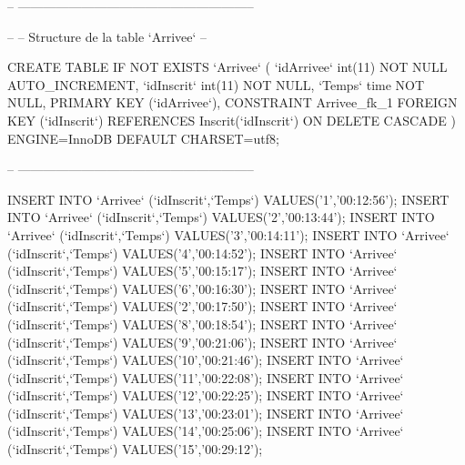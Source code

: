 \begin{DoxyCode}
-- --------------------------------------------------------

--
-- Structure de la table `Arrivee`
--

CREATE TABLE IF NOT EXISTS `Arrivee` (
  `idArrivee` int(11) NOT NULL AUTO\_INCREMENT, 
  `idInscrit` int(11) NOT NULL,
  `Temps` time NOT NULL,
  PRIMARY KEY (`idArrivee`),
  CONSTRAINT Arrivee\_fk\_1 FOREIGN KEY (`idInscrit`) REFERENCES Inscrit(`idInscrit`) ON DELETE CASCADE
) ENGINE=InnoDB DEFAULT CHARSET=utf8;

-- --------------------------------------------------------

INSERT INTO `Arrivee` (`idInscrit`,`Temps`) VALUES('1','00:12:56');
INSERT INTO `Arrivee` (`idInscrit`,`Temps`) VALUES('2','00:13:44');
INSERT INTO `Arrivee` (`idInscrit`,`Temps`) VALUES('3','00:14:11');
INSERT INTO `Arrivee` (`idInscrit`,`Temps`) VALUES('4','00:14:52');
INSERT INTO `Arrivee` (`idInscrit`,`Temps`) VALUES('5','00:15:17');
INSERT INTO `Arrivee` (`idInscrit`,`Temps`) VALUES('6','00:16:30');
INSERT INTO `Arrivee` (`idInscrit`,`Temps`) VALUES('2','00:17:50');
INSERT INTO `Arrivee` (`idInscrit`,`Temps`) VALUES('8','00:18:54');
INSERT INTO `Arrivee` (`idInscrit`,`Temps`) VALUES('9','00:21:06');
INSERT INTO `Arrivee` (`idInscrit`,`Temps`) VALUES('10','00:21:46');
INSERT INTO `Arrivee` (`idInscrit`,`Temps`) VALUES('11','00:22:08');
INSERT INTO `Arrivee` (`idInscrit`,`Temps`) VALUES('12','00:22:25');
INSERT INTO `Arrivee` (`idInscrit`,`Temps`) VALUES('13','00:23:01');
INSERT INTO `Arrivee` (`idInscrit`,`Temps`) VALUES('14','00:25:06');
INSERT INTO `Arrivee` (`idInscrit`,`Temps`) VALUES('15','00:29:12');
\end{DoxyCode}
 